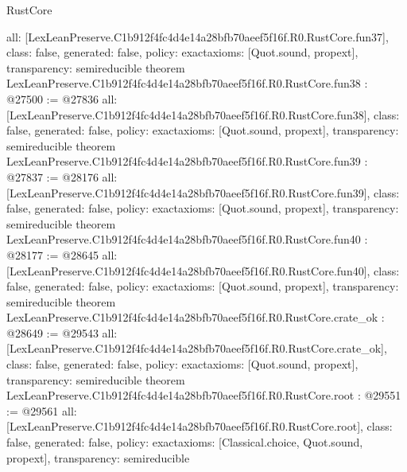 \begin{lexlean}{RustCore}
\begin{coremodule}
{  all: [LexLeanPreserve.C1b912f4fc4d4e14a28bfb70aeef5f16f.R0.RustCore.fun37],
  class: false,
  generated: false,
  policy: exact{axioms: [Quot.sound, propext]},
  transparency: semireducible
}
theorem LexLeanPreserve.C1b912f4fc4d4e14a28bfb70aeef5f16f.R0.RustCore.fun38 : @27500 := @27836 {
  all: [LexLeanPreserve.C1b912f4fc4d4e14a28bfb70aeef5f16f.R0.RustCore.fun38],
  class: false,
  generated: false,
  policy: exact{axioms: [Quot.sound, propext]},
  transparency: semireducible
}
theorem LexLeanPreserve.C1b912f4fc4d4e14a28bfb70aeef5f16f.R0.RustCore.fun39 : @27837 := @28176 {
  all: [LexLeanPreserve.C1b912f4fc4d4e14a28bfb70aeef5f16f.R0.RustCore.fun39],
  class: false,
  generated: false,
  policy: exact{axioms: [Quot.sound, propext]},
  transparency: semireducible
}
theorem LexLeanPreserve.C1b912f4fc4d4e14a28bfb70aeef5f16f.R0.RustCore.fun40 : @28177 := @28645 {
  all: [LexLeanPreserve.C1b912f4fc4d4e14a28bfb70aeef5f16f.R0.RustCore.fun40],
  class: false,
  generated: false,
  policy: exact{axioms: [Quot.sound, propext]},
  transparency: semireducible
}
theorem LexLeanPreserve.C1b912f4fc4d4e14a28bfb70aeef5f16f.R0.RustCore.crate_ok : @28649 := @29543 {
  all: [LexLeanPreserve.C1b912f4fc4d4e14a28bfb70aeef5f16f.R0.RustCore.crate_ok],
  class: false,
  generated: false,
  policy: exact{axioms: [Quot.sound, propext]},
  transparency: semireducible
}
theorem LexLeanPreserve.C1b912f4fc4d4e14a28bfb70aeef5f16f.R0.RustCore.root : @29551 := @29561 {
  all: [LexLeanPreserve.C1b912f4fc4d4e14a28bfb70aeef5f16f.R0.RustCore.root],
  class: false,
  generated: false,
  policy: exact{axioms: [Classical.choice, Quot.sound, propext]},
  transparency: semireducible
}


\end{coremodule}
\end{lexlean}
